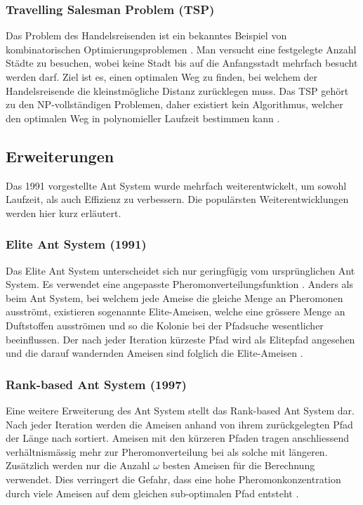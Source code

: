 \subsubsection{Travelling Salesman Problem (TSP)}
Das Problem des Handelsreisenden ist ein bekanntes Beispiel von kombinatorischen Optimierungsproblemen
\cite{Wiki05}. Man versucht eine festgelegte Anzahl Städte zu besuchen, wobei keine Stadt bis auf die
Anfangsstadt mehrfach besucht werden darf. Ziel ist es, einen optimalen Weg zu finden, bei welchem der
Handelsreisende die kleinstmögliche Distanz zurücklegen muss. Das TSP gehört zu den NP-vollständigen
Problemen, daher existiert kein Algorithmus, welcher den optimalen Weg in polynomieller Laufzeit bestimmen
kann \cite{Wiki06}.

\subsection{Erweiterungen}
Das 1991 vorgestellte Ant System wurde mehrfach weiterentwickelt, um sowohl Laufzeit, als auch Effizienz zu
verbessern. Die populärsten Weiterentwicklungen werden hier kurz erläutert.

\subsubsection{Elite Ant System (1991)}
Das Elite Ant System unterscheidet sich nur geringfügig vom ursprünglichen Ant System. Es verwendet eine
angepasste Pheromonverteilungsfunktion \cite{MZ14}. Anders als beim Ant System, bei welchem jede Ameise
die gleiche Menge an Pheromonen ausströmt, existieren sogenannte Elite-Ameisen, welche eine grössere Menge
an Duftstoffen ausströmen und so die Kolonie bei der Pfadsuche wesentlicher beeinflussen. Der
nach jeder Iteration kürzeste Pfad wird als Elitepfad angesehen und die darauf wandernden Ameisen sind
folglich die Elite-Ameisen \cite{BHS99}.

\subsubsection{Rank-based Ant System (1997)}
Eine weitere Erweiterung des Ant System stellt das Rank-based Ant System dar. Nach jeder Iteration werden
die Ameisen anhand von ihrem zurückgelegten Pfad der Länge nach sortiert. Ameisen mit den kürzeren Pfaden
tragen anschliessend verhältnismässig mehr zur Pheromonverteilung bei als solche mit längeren. Zusätzlich
werden nur die Anzahl $\omega$ besten Ameisen für die Berechnung verwendet. Dies verringert die Gefahr, dass
eine hohe Pheromonkonzentration durch viele Ameisen auf dem gleichen sub-optimalen Pfad entsteht
\cite{BHS99}.

